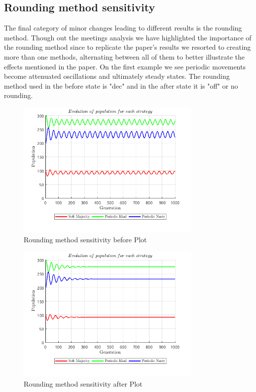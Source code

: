 \subsection{Rounding method sensitivity}
The final category of minor changes leading to different results is the rounding method. Though out the meetings analysis we have highlighted the importance of the rounding method since to replicate the paper's results we resorted to creating more than one methods, alternating between all of them to better illustrate the effects mentioned in the paper. On the first example we see periodic movements become attenuated oscillations and ultimately steady states. The rounding method used in the before state is "dec" and in the after state it is "off" or no rounding.
\begin{figure}[H]
    \centering
    \includegraphics[width=0.8\textwidth]{media/meetings/rounding_method_sensitivity_before_dec.png}
    \caption{Rounding method sensitivity before Plot}
\end{figure}
\begin{figure}[H]
    \centering
    \includegraphics[width=0.8\textwidth]{media/meetings/rounding_method_sensitivity_after_off.png}
    \caption{Rounding method sensitivity after Plot}
\end{figure}
